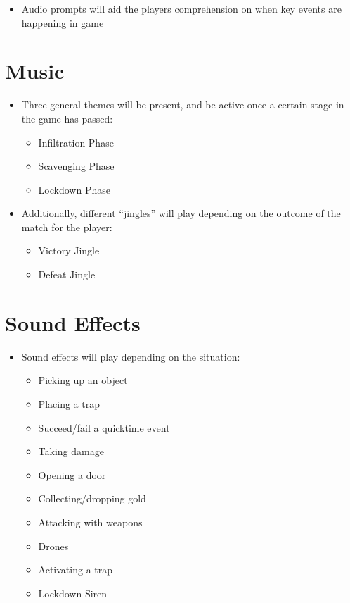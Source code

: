 \documentclass[14pt]{report}
\begin{document}
\begin{itemize}
    \item Audio prompts will aid the players comprehension on when key events are happening in game
\end{itemize}

\section{Music}

\begin{itemize}
    \item Three general themes will be present, and be active once a certain stage in the game has passed:
    \begin{itemize}
        \item Infiltration Phase
        \item Scavenging Phase
        \item Lockdown Phase
    \end{itemize}
    \item Additionally, different “jingles” will play depending on the outcome of the match for the player:
    \begin{itemize}
        \item Victory Jingle
        \item Defeat Jingle
    \end{itemize}
\end{itemize}

\section{Sound Effects}

\begin{itemize}
    \item Sound effects will play depending on the situation:
    \begin{itemize}
        \item Picking up an object
        \item Placing a trap
        \item Succeed/fail a quicktime event
        \item Taking damage
        \item Opening a door
        \item Collecting/dropping gold
        \item Attacking with weapons
        \item Drones
        \item Activating a trap
        \item Lockdown Siren
    \end{itemize}
\end{itemize}
\end{document}
